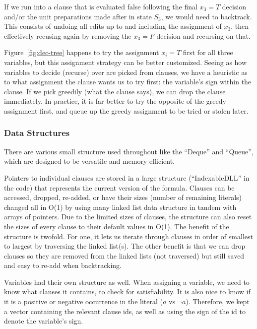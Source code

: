 \documentclass{article}
\begin{document}
If we run into a clause that is evaluated false following the final $x_3 = T$ decision and/or the unit preparations made after in state $S_3$, we would need to backtrack. This consists of undoing all edits up to and including the assignment of $x_3$, then effectively recusing again by removing the $x_3 = F$ decision and recursing on that. 

Figure~\ref{fig:dec-tree} happens to try the assignment $x_i = T$ first for all three variables, but this assignment strategy can be better customized. Seeing as how variables to decide (recurse) over are picked from clauses, we have a heuristic as to what assignment the clause wants us to try first: the variable's sign within the clause. If we pick greedily (what the clause says), we can drop the clause immediately. In practice, it is far better to try the opposite of the greedy assignment first, and queue up the greedy assignment to be tried or stolen later.

\subsubsection{Data Structures}

There are various small structure used throughout like the ``Deque'' and ``Queue'', which are designed to be versatile and memory-efficient.

Pointers to individual clauses are stored in a large structure (``IndexableDLL'' in the code) that represents the current version of the formula. Clauses can be accessed, dropped, re-added, or have their sizes (number of remaining literals) changed all in O(1) by using many linked list data structure in tandem with arrays of pointers. Due to the limited sizes of clauses, the structure can also reset the sizes of every clause to their default values in O(1). The benefit of the structure is twofold. For one, it lets us iterate through clauses in order of smallest to largest by traversing the linked list(s). The other benefit is that we can drop clauses so they are removed from the linked lists (not traversed) but still saved and easy to re-add when backtracking.

Variables had their own structure as well.
When assigning a variable, we need to know what clauses it contains, to check for satisfiability.
It is also nice to know if it is a positive or negative occurrence in the literal ($a$ vs $\neg a$).
Therefore, we kept a vector containing the relevant clause ids, as well as using the sign of the id to denote the variable's sign.
\end{document}
